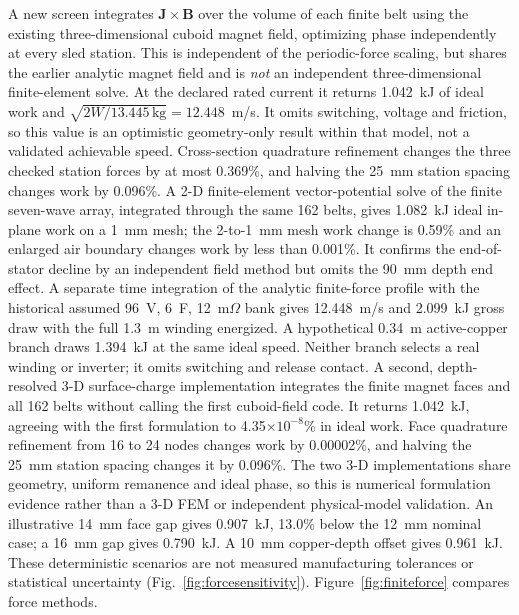 \documentclass[conference]{IEEEtran}
\begin{document}
A new screen integrates $\mathbf{J}\times\mathbf{B}$ over the volume of each finite belt using the existing three-dimensional cuboid magnet field, optimizing phase independently at every sled station. This is independent of the periodic-force scaling, but shares the earlier analytic magnet field and is \emph{not} an independent three-dimensional finite-element solve. At the declared rated current it returns 1.042~kJ of ideal work and $\sqrt{2W/13.445\,\mathrm{kg}}=12.448$~m/s. It omits switching, voltage and friction, so this value is an optimistic geometry-only result within that model, not a validated achievable speed. Cross-section quadrature refinement changes the three checked station forces by at most 0.369\%, and halving the 25~mm station spacing changes work by 0.096\%. A 2-D finite-element vector-potential solve of the finite seven-wave array, integrated through the same 162 belts, gives 1.082~kJ ideal in-plane work on a 1~mm mesh; the 2-to-1~mm mesh work change is 0.59\% and an enlarged air boundary changes work by less than 0.001\%. It confirms the end-of-stator decline by an independent field method but omits the 90~mm depth end effect. A separate time integration of the analytic finite-force profile with the historical assumed 96~V, 6~F, 12~m$\Omega$ bank gives 12.448~m/s and 2.099~kJ gross draw with the full 1.3~m winding energized. A hypothetical 0.34~m active-copper branch draws 1.394~kJ at the same ideal speed. Neither branch selects a real winding or inverter; it omits switching and release contact. A second, depth-resolved 3-D surface-charge implementation integrates the finite magnet faces and all 162 belts without calling the first cuboid-field code. It returns 1.042~kJ, agreeing with the first formulation to 4.35$\times10^{-8}$\% in ideal work. Face quadrature refinement from 16 to 24 nodes changes work by 0.00002\%, and halving the 25~mm station spacing changes it by 0.096\%. The two 3-D implementations share geometry, uniform remanence and ideal phase, so this is numerical formulation evidence rather than a 3-D FEM or independent physical-model validation. An illustrative 14~mm face gap gives 0.907~kJ, 13.0\% below the 12~mm nominal case; a 16~mm gap gives 0.790~kJ. A 10~mm copper-depth offset gives 0.961~kJ. These deterministic scenarios are not measured manufacturing tolerances or statistical uncertainty (Fig.~\ref{fig:forcesensitivity}). Figure~\ref{fig:finiteforce} compares force methods.
\end{document}
